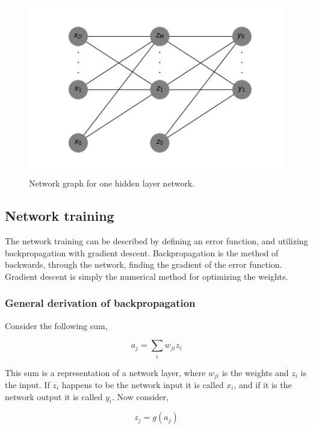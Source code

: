 \documentclass[12pt, letterpaper]{amsart}%
\begin{document}
\begin{figure}[h]%
\caption{Network graph for one hidden layer network.}
\centering
\includegraphics[scale=0.8]{Network.png}
\end{figure}


\subsection{Network training}
The network training can be described by defining an error function, and utilizing backpropagation with gradient descent. Backpropagation is the method of backwards, through the network, finding the gradient of the error function. Gradient descent is simply the numerical method for optimizing the weights.

\subsubsection{General derivation of backpropagation}
Consider the following sum,

\begin{equation}
    a_j = \sum_i w_{ji}z_i
\end{equation}

This sum is a representation of a network layer, where $w_{ji}$ is the weights and $z_i$ is the input. If $z_i$ happens to be the network input it is called $x_i$, and if it is the network output it is called $y_i$. Now consider,

\begin{equation}
    z_j = g(a_j)
\end{equation}
\end{document}
